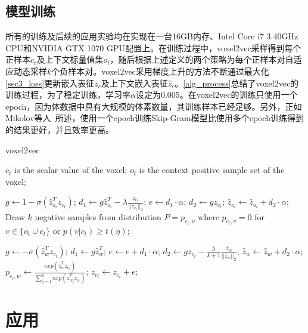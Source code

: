 \subsection{模型训练}

所有的训练及后续的应用实验均在实现在一台16GB内存、Intel Core i7 3.40GHz CPU和NVIDIA GTX 1070 GPU配置上。在训练过程中，voxel2vec采样得到每个正样本$c_t$及上下文标量值集$o_t$，随后根据上述定义的两个策略为每个正样本对自适应动态采样$k$个负样本对。voxel2vec采用梯度上升的方法不断通过最大化\autoref{sec3_loss}更新嵌入表征$z_{c}$及上下文嵌入表征$\hat{z}_{c}$。\autoref{alg_process}总结了voxel2vec的训练过程，为了稳定训练，学习率$\alpha$设定为0.005。在voxel2vec的训练只使用一个epoch，因为体数据中具有大规模的体素数量，其训练样本已经足够。另外，正如Mikolov等人~\cite{MIKOLOV:2013:EEO}所述，使用一个epoch训练Skip-Gram模型比使用多个epoch训练得到的结果更好，并且效率更高。


\begin{algorithm}[t]
	\caption{voxel2vec}
	\begin{algorithmic}[1]
		\State $c_t$ is the scalar value of the voxel;
		\State $o_t$ is the context positive sample set of the voxel;
		
		\State $g \gets 1 - \sigma (\hat{z}_{o_i}^{T} z_{c_t})$;
		\State $d_1 \gets g\hat{z}_{o_i}^{T} - \lambda \frac{z_{c_t}}{||z_{c_t}||_2} $;
		\State $e \gets d_1\cdot \alpha$;
		\State $d_2 \gets gz_{c_t}$;
		\State $\hat{z}_{o_i} \gets \hat{z}_{o_i} + d_2\cdot \alpha$;
		\State Draw $k$ negative samples from distribution $P = p_{c_t, v}$ where $p_{c_t, v} = 0$ for $v\in \{o_t \cup c_t\}$ or $p(v|c_t)\geq t(\eta)$;
		
		\State $g \gets - \sigma (\hat{z}_w^{T} z_{c_t})$;
		\State $d_1 \gets g\hat{z}_w^{T} $;
		\State $e \gets e+d_1\cdot \alpha$;
		\State $d_2 \gets gz_{c_t} - \frac{\lambda}{k+1}\frac{\hat{z}_w}{||\hat{z}_w||_2}$;
		\State $\hat{z}_w \gets \hat{z}_w + d_2\cdot \alpha$;
		\State $p_{c_t,w} \gets \frac{exp(\hat{z}_w^T z_{c_t})}{\sum_{j=1}^{k}exp(\hat{z}_{w_j}^T z_{c_t})}$;
		\EndFor
		\State $z_{c_t} \gets z_{c_t}+e$;
		\EndFor
		
		\EndFor
	\end{algorithmic}
	\label{alg_process}
\end{algorithm}


\section{应用}

